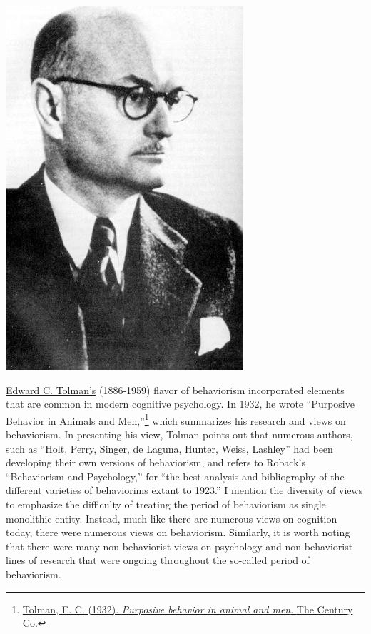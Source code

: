 \documentclass[
  oneside,
  12pt]{crumpbook}
\newenvironment{floatright25}{%
  \wrapfigure{R}{.25\textwidth}%
  }{%
  \endwrapfigure}
\begin{document}
\begin{floatright25}
\includegraphics[width=1\linewidth]{imgs/Tolman_portrait}

\end{floatright25}

\href{https://en.wikipedia.org/wiki/Edward_C._Tolman}{Edward C. Tolman's} (1886-1959) flavor of behaviorism incorporated elements that are common in modern cognitive psychology. In 1932, he wrote ``Purposive Behavior in Animals and Men,''\footnote{\protect\hyperlink{ref-tolmanPurposiveBehaviorAnimal1932}{Tolman, E. C. (1932). \emph{Purposive behavior in animal and men}. {The Century Co.}}} which summarizes his research and views on behaviorism. In presenting his view, Tolman points out that numerous authors, such as ``Holt, Perry, Singer, de Laguna, Hunter, Weiss, Lashley'' had been developing their own versions of behaviorism, and refers to Roback's ``Behaviorism and Psychology,'' for ``the best analysis and bibliography of the different varieties of behaviorims extant to 1923.'' I mention the diversity of views to emphasize the difficulty of treating the period of behaviorism as single monolithic entity. Instead, much like there are numerous views on cognition today, there were numerous views on behaviorism. Similarly, it is worth noting that there were many non-behaviorist views on psychology and non-behaviorist lines of research that were ongoing throughout the so-called period of behaviorism.
\end{document}
